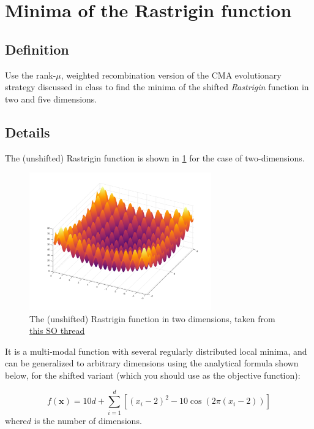 \documentclass[11pt]{article}
\begin{document}
\section{Minima of the Rastrigin function}
\label{sec:orgcb89dfb}
\subsection{Definition}
\label{sec:org990fbb3}
  Use the rank-\(\mu\), weighted recombination version of the CMA
evolutionary strategy discussed in class to find the minima of the shifted
\emph{Rastrigin} function in two and five dimensions.

\subsection{Details}
\label{sec:orgdcd9db3}
The (unshifted) Rastrigin function is shown in \cref{rastr} for the case of two-dimensions.

\begin{figure}[htbp]
\centering
\includegraphics[width=0.7\textwidth]{images/rastrigin.png}
\caption{\label{rastr}
The (unshifted) Rastrigin function in two dimensions, taken from \href{https://stackoverflow.com/a/43112733}{this SO thread}}
\end{figure}

It is a multi-modal function with several regularly distributed local minima,
and can be generalized to arbitrary dimensions using the analytical formula
shown below, for the shifted variant (which you should use as the objective
function):

\begin{equation}
f(\mathbf{x}) = 10d + \sum_{i=1}^{d} \left[ (x_i - 2)^2 - 10 \cos\left(2 \pi (x_i - 2) \right) \right]
\end{equation}
where\(d\) is the number of dimensions.
\end{document}
